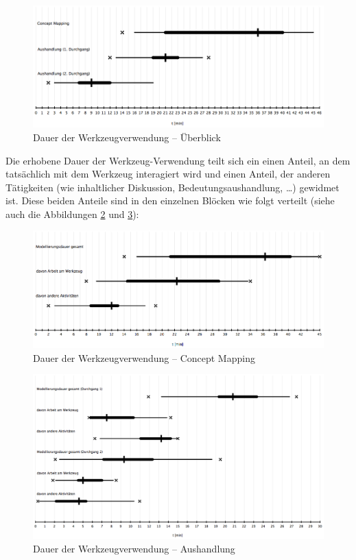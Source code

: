 \begin{figure}[htbp]
	\centering
		\includegraphics[width=15cm]{img/Evaluierung/usageTimeOverview.png}
	\caption{Dauer der Werkzeugverwendung -- Überblick}
	\label{fig:img_Evaluierung_usageTimeOverview}
\end{figure}

Die erhobene Dauer der Werkzeug-Verwendung teilt sich ein einen Anteil, an dem tatsächlich mit dem Werkzeug interagiert wird und einen Anteil, der anderen Tätigkeiten (wie inhaltlicher Diskussion, Bedeutungsaushandlung, \ldots) gewidmet ist. Diese beiden Anteile sind in den einzelnen Blöcken wie folgt verteilt (siehe auch die Abbildungen \ref{fig:img_Evaluierung_usageTimeConceptMapping} und \ref{fig:img_Evaluierung_usageTimeNegotiation}):

\begin{figure}[htbp]
	\centering
		\includegraphics[width=15cm]{img/Evaluierung/usageTimeConceptMapping.png}
	\caption{Dauer der Werkzeugverwendung -- Concept Mapping}
	\label{fig:img_Evaluierung_usageTimeConceptMapping}
\end{figure}

\begin{figure}[htbp]
	\centering
		\includegraphics[width=15cm]{img/Evaluierung/usageTimeNegotiation.png}
	\caption{Dauer der Werkzeugverwendung -- Aushandlung}
	\label{fig:img_Evaluierung_usageTimeNegotiation}
\end{figure}

